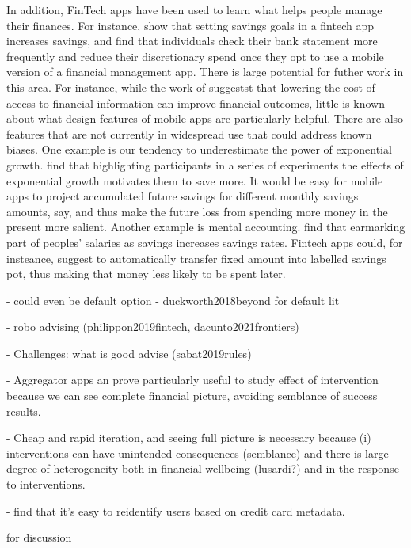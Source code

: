 In addition, FinTech apps have been used to learn what helps people manage
their finances. For instance, \citet{gargano2021goal} show that setting savings
goals in a fintech app increases savings, and \citet{levi2020mind} find that
individuals check their bank statement more frequently and reduce their
discretionary spend once they opt to use a mobile version of a financial
management app. There is large potential for futher work in this area. For
instance, while the work of \citet{levi2020mind} suggestst that lowering the
cost of access to financial information can improve financial outcomes, little
is known about what design features of mobile apps are particularly helpful.
There are also features that are not currently in widespread use that could
address known biases. One example is our tendency to underestimate the power of
exponential growth. \citet{mckenzie2011misunderstanding} find that highlighting
participants in a series of experiments the effects of exponential growth
motivates them to save more. It would be easy for mobile apps to project
accumulated future savings for different monthly savings amounts, say, and thus
make the future loss from spending more money in the present more salient.
Another example is mental accounting. \citet{soman2011earmarking} find that
earmarking part of peoples' salaries as savings increases savings rates.
Fintech apps could, for insteance, suggest to automatically transfer fixed
amount into labelled savings pot, thus making that money less likely to be
spent later.


- could even be default option - duckworth2018beyond for default lit


- robo advising (philippon2019fintech, dacunto2021frontiers)

- Challenges: what is good advise (sabat2019rules)

\citet{guttman2021semblance}
- Aggregator apps an prove particularly useful to study effect of intervention
because we can see complete financial picture, avoiding semblance of success
results. 

- Cheap and rapid iteration, and seeing full picture is necessary because (i)
interventions can have unintended consequences (semblance) and there is large
degree of heterogeneity both in financial wellbeing (lusardi?) and in the
response to interventions.




- \citet{demontjoye2015unique} find that it's easy to reidentify users based on
credit card metadata.

\citet{kosinski2015facebook} for discussion

